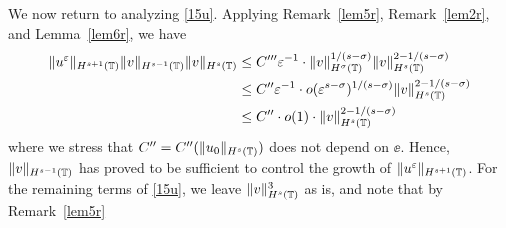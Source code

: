 %
%
%
%
%
%
%
%
%
%
%
%
%
%
%
%
%
%
%
%
%
%
%
%
%
%
%
%
%
We now return to analyzing
\eqref{15u}. Applying Remark~\ref{lem5r}, Remark~\ref{lem2r}, and Lemma~\ref{lem6r}, we have
\begin{equation}
\begin{split}
\label{200x}
\|u^\varepsilon \|_{H^{s+1}(\mathbb{T})} \|v \|_{H^{s-1}(\mathbb{T})} \|v\|_{H^s(\mathbb{T})}
& \le C''' \varepsilon^{-1} \cdot \|v\|_{H^\sigma(\mathbb{T})}^{1/(s-\sigma)}
\|v\|_{H^s(\mathbb{T})}^{2 - 1/(s- \sigma)}
\\
& \le C'' \varepsilon^{-1} \cdot o(\varepsilon^{s- \sigma})^{1/(s-\sigma)}
\|v\|_{H^s(\mathbb{T})}^{2- 1/(s-\sigma)}
\\
& \le C'' \cdot o(1) \cdot \|v\|_{H^s(\mathbb{T})}^{2- 1/(s-\sigma)}
\end{split}
\end{equation}
where we stress that $C'' = C''(\|u_0\|_{H^s(\mathbb{T})})$ does not depend on $\ee$.
Hence, $\|v\|_{H^{s-1}(\mathbb{T})}$ has proved to be sufficient to control the
growth of $\|u^\varepsilon \|_{H^{s+1}(\mathbb{T})}$. For the remaining terms of
\eqref{15u}, we leave $\|v\|_{H^s(\mathbb{T})}^3$ as is, and note that by Remark~\ref{lem5r}
